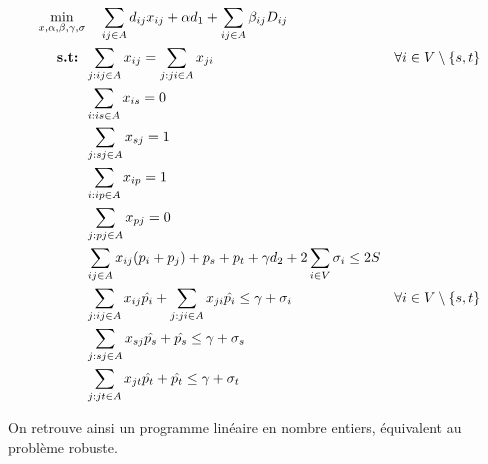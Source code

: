 \documentclass{article}
\begin{document}
\begin{align}
  \min_{x, \alpha, \beta, \gamma, \sigma} & \ \ \ \sum_{ij \in A} d_{ij} x_{ij} + \alpha d_1 + \sum_{ij \in A} \beta_{ij} D_{ij} && \notag \\
  \textbf{s.t: }  &\sum_{j: ij \in A} x_{ij} = \sum_{j: ji \in A} x_{ji} && \forall i \in V \setminus{\{s,t\}} \notag \\
  &\sum_{i: is \in A} x_{is} = 0 \notag \\
  &\sum_{j: sj \in A} x_{sj} = 1 \notag \\
  &\sum_{i: ip \in A} x_{ip} = 1 \notag \\
  &\sum_{j: pj \in A} x_{pj} = 0 \notag \\
  &\sum_{ij \in A} x_{ij} (p_i + p_j) + p_s + p_t + \gamma d_2 + 2 \sum_{i \in V} \sigma_i \leq 2S \notag \\
  & \sum_{j: ij \in A} x_{ij} \hat{p_i} + \sum_{j: ji \in A} x_{ji} \hat{p_i} \leq \gamma + \sigma_i && \forall i \in V \setminus{\{s,t\}} \\
  & \sum_{j: sj \in A} x_{sj} \hat{p_s} + \hat{p_s} \leq \gamma + \sigma_s \\
  & \sum_{j: jt \in A} x_{jt} \hat{p_t} + \hat{p_t} \leq \gamma + \sigma_t
\end{align}

On retrouve ainsi un programme linéaire en nombre entiers, équivalent au problème robuste.











\end{document}
